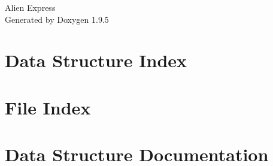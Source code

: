 \documentclass[twoside]{book}
\newcommand{\+}{\discretionary{\mbox{\scriptsize$\hookleftarrow$}}{}{}}
\newcommand{\clearemptydoublepage}{%
    \newpage{\pagestyle{empty}\cleardoublepage}%
  }
\begin{document}
  \raggedbottom
    \hypersetup{pageanchor=false,
                bookmarksnumbered=true,
                pdfencoding=unicode
               }
  \begin{titlepage}
  \vspace*{7cm}
  \begin{center}%
  {\Large Alien Express}\\
  \vspace*{1cm}
  {\large Generated by Doxygen 1.9.5}\\
  \end{center}
  \end{titlepage}
  \clearemptydoublepage
  \tableofcontents
  \clearemptydoublepage
  \hypersetup{pageanchor=true}
\chapter{Data Structure Index}

\chapter{File Index}

\chapter{Data Structure Documentation}





\end{document}
